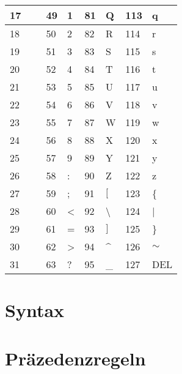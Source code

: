 \begin{table}[h]
{\begin{tabular}{|l|l||l|l||l|l||l|l|}
    17   & ~       & 49   & 1       & 81   & Q       & 113  & q       \\ \hline
    18   & ~       & 50   & 2       & 82   & R       & 114  & r       \\ \hline
    19   & ~       & 51   & 3       & 83   & S       & 115  & s       \\ \hline
    20   & ~       & 52   & 4       & 84   & T       & 116  & t       \\ \hline
    21   & ~       & 53   & 5       & 85   & U       & 117  & u       \\ \hline
    22   & ~       & 54   & 6       & 86   & V       & 118  & v       \\ \hline
    23   & ~       & 55   & 7       & 87   & W       & 119  & w       \\ \hline
    24   & ~       & 56   & 8       & 88   & X       & 120  & x       \\ \hline
    25   & ~       & 57   & 9       & 89   & Y       & 121  & y       \\ \hline
    26   & ~       & 58   & :       & 90   & Z       & 122  & z       \\ \hline
    27   & ~       & 59   & ;       & 91   & $[$     & 123  & \{      \\ \hline
    28   & ~       & 60   & <       & 92   & \textbackslash & 124  & |       \\ \hline
    29   & ~       & 61   & =       & 93   & $]$     & 125  & \}      \\ \hline
    30   & ~       & 62   & >       & 94   & \textasciicircum & 126  & $\sim$  \\ \hline
    31   & ~       & 63   & ?       & 95   & \_      & 127  & DEL     \\ \hline
    \end{tabular}
    }
\end{table}
\section{Syntax}
\section{Präzedenzregeln}


